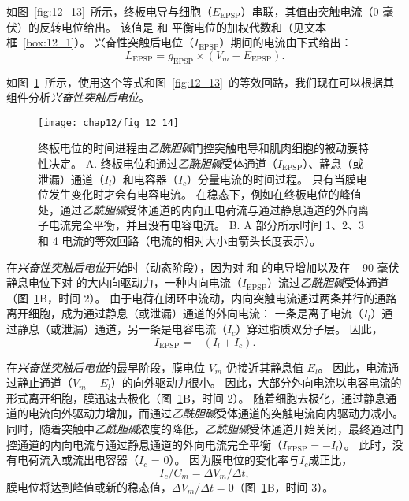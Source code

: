 如图~\ref{fig:12_13}~所示，终板电导与细胞（$E_{\text{EPSP}}$）串联，其值由突触电流（0 毫伏）的反转电位给出。
该值是  和  平衡电位的加权代数和（见文本框~\ref{box:12_1}）。
兴奋性突触后电位（$I_{\text{EPSP}}$）期间的电流由下式给出：
\begin{equation}\label{excitatory_potential}
	L_{\text{EPSP}} = g_{\text{EPSP}} \times (V_m - E_{\text{EPSP}}).
\end{equation}


如图~\ref{fig:12_14}~所示，使用这个等式和图~\ref{fig:12_13}~的等效回路，我们现在可以根据其组件分析\textit{兴奋性突触后电位}。


\begin{figure}[htbp]
	\centering
	\texttt{[image: chap12/fig\_12\_14]}
	\caption{终板电位的时间进程由\textit{乙酰胆碱}门控突触电导和肌肉细胞的被动膜特性决定。
		A. 终板电位和通过\textit{乙酰胆碱}受体通道（$I_{\text{EPSP}}$）、静息（或泄漏）通道（$ I_l $）和电容器（$ I_c $）分量电流的时间过程。
		只有当膜电位发生变化时才会有电容电流。
		在稳态下，例如在终板电位的峰值处，通过\textit{乙酰胆碱}受体通道的内向正电荷流与通过静息通道的外向离子电流完全平衡，并且没有电容电流。
		B. A 部分所示时间 1、2、3 和 4 电流的等效回路（电流的相对大小由箭头长度表示）。}
	\label{fig:12_14}
\end{figure}


在\textit{兴奋性突触后电位}开始时（动态阶段），因为对  和  的电导增加以及在 −90 毫伏静息电位下对  的大内向驱动力，一种内向电流（$I_{\text{EPSP}}$）流过\textit{乙酰胆碱}受体通道 （图~\ref{fig:12_14}B，时间 2）。
由于电荷在闭环中流动，内向突触电流通过两条并行的通路离开细胞，成为通过静息（或泄漏）通道的外向电流：
一条是离子电流（$I_l$）通过静息（或泄漏）通道，另一条是电容电流（$I_c$）穿过脂质双分子层。
%
因此，
\begin{equation}\label{ionic_current}
	I_{\text{EPSP}} = -(I_l + I_c).
\end{equation}

在\textit{兴奋性突触后电位}的最早阶段，膜电位 $V_m$ 仍接近其静息值 $ E_l $。
因此，电流通过静止通道（$V_m - E_l$）的向外驱动力很小。
因此，大部分外向电流以电容电流的形式离开细胞，膜迅速去极化（图~\ref{fig:12_14}B，时间 2）。
随着细胞去极化，通过静息通道的电流向外驱动力增加，而通过\textit{乙酰胆碱}受体通道的突触电流向内驱动力减小。
同时，随着突触中\textit{乙酰胆碱}浓度的降低，\textit{乙酰胆碱}受体通道开始关闭，最终通过门控通道的内向电流与通过静息通道的外向电流完全平衡（$I_{\text{EPSP}} = - I_l$）。
此时，没有电荷流入或流出电容器（$ I_c $ = 0）。
因为膜电位的变化率与$ I_c $成正比，
%
\begin{equation}\label{rate_potential}
	I_c / C_m = \Delta V_m / \Delta t,
\end{equation}
%
膜电位将达到峰值或新的稳态值，$\Delta V_m / \Delta t = 0 $（图~\ref{fig:12_14}B，时间 3）。


